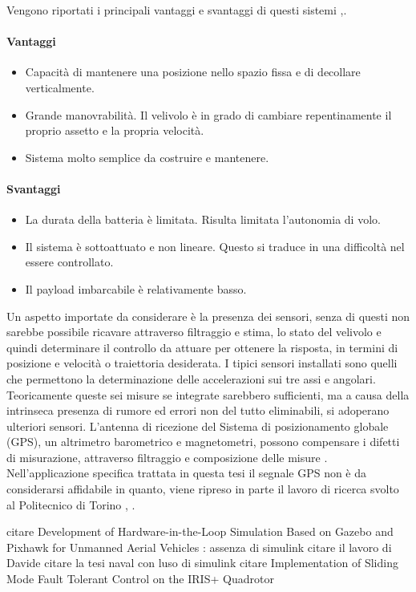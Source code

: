 Vengono riportati i principali vantaggi e svantaggi di questi sistemi \cite{DesTestCarm},\cite{irisquad}.
\paragraph{Vantaggi}
\begin{itemize}
	\item Capacità di mantenere una posizione nello spazio fissa e di decollare verticalmente.
	\item Grande manovrabilità. Il velivolo è in grado di cambiare repentinamente il proprio assetto e la propria velocità.
	\item Sistema molto semplice da costruire e mantenere.
\end{itemize}
\paragraph{Svantaggi}
\begin{itemize}
	\item La durata della batteria è limitata. Risulta limitata l'autonomia di volo.
	\item Il sistema è sottoattuato e non lineare. Questo si traduce in una difficoltà nel essere controllato.
	\item Il payload imbarcabile è relativamente basso.
\end{itemize}

Un aspetto importate da considerare è la presenza dei sensori, senza di questi non sarebbe possibile ricavare attraverso filtraggio e stima, lo stato del velivolo e quindi determinare il controllo da attuare per ottenere la risposta, in termini di posizione e velocità o traiettoria desiderata. I tipici sensori installati sono quelli che permettono la determinazione delle accelerazioni sui tre assi e angolari. Teoricamente queste sei misure se integrate sarebbero sufficienti, ma a causa della intrinseca presenza di rumore ed errori non del tutto eliminabili, si adoperano ulteriori sensori. L'antenna di ricezione del Sistema di posizionamento globale (GPS), un altrimetro barometrico e magnetometri, possono compensare i difetti di misurazione, attraverso filtraggio e composizione delle misure \cite{KoksalN2018ALQA}. Nell'applicazione specifica trattata in questa tesi il segnale GPS non è da considerarsi affidabile in quanto, viene ripreso in parte il lavoro di ricerca svolto al Politecnico di Torino \cite{DesTestCarm}, \cite{baseTesi}.

\begin{commento}
citare Development of Hardware-in-the-Loop Simulation Based on Gazebo
	and Pixhawk for Unmanned Aerial Vehicles : assenza di simulink
citare il lavoro di Davide
citare la tesi naval con luso di simulink
citare Implementation of Sliding Mode Fault Tolerant Control on the IRIS+
Quadrotor
\end{commento}

